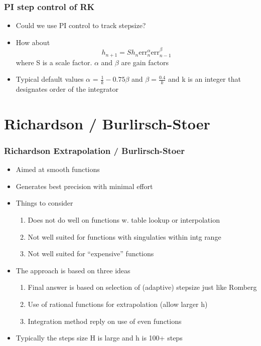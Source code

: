 \documentclass[10pt]{beamer}
\begin{document}
\begin{frame}
  \frametitle{PI step control of RK}
  \begin{itemize}
  \item Could we use PI control to track stepsize? \pause
  \item How about
    \[
      h_{n+1} = S h_n \mbox{err}_n^{\alpha} \mbox{err}_{n-1}^{\beta}
    \]
    where S is a scale factor. $\alpha$ and $\beta$ are gain factors
  \item Typical default values $\alpha$ = $\frac{1}{k} - 0.75 \beta$
    and $\beta = \frac{0.4}{k}$ and k is an integer that designates
    order of the integrator
  \end{itemize}
\end{frame}
\section{Richardson / Burlirsch-Stoer}

\begin{frame}
  \frametitle{Richardson Extrapolation / Burlirsch-Stoer}
  \begin{itemize}
  \item Aimed at smooth functions 
  \item Generates best precision with minimal effort
  \item Things to consider
    \begin{enumerate}
    \item Does not do well on functions w. table lookup or interpolation
    \item Not well suited for functions with singulaties within intg range
    \item Not well suited for ``expensive'' functions
    \end{enumerate}
  \item The approach is based on three ideas
    \begin{enumerate}
    \item Final answer is based on selection of (adaptive) stepsize just like Romberg
    \item Use of rational functions for extrapolation (allow larger h)
    \item Integration method reply on use of even functions
    \end{enumerate}
  \item Typically the steps size H is large and h is 100+ steps
  \end{itemize}
\end{frame}
\end{document}
